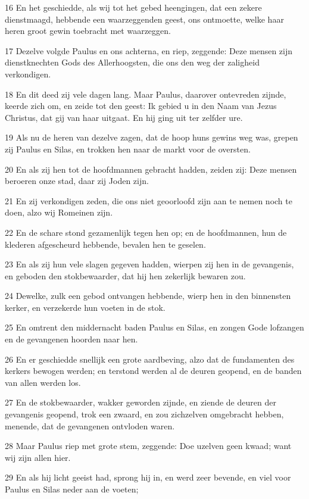 \par 16 En het geschiedde, als wij tot het gebed heengingen, dat een zekere dienstmaagd, hebbende een waarzeggenden geest, ons ontmoette, welke haar heren groot gewin toebracht met waarzeggen.
\par 17 Dezelve volgde Paulus en ons achterna, en riep, zeggende: Deze mensen zijn dienstknechten Gods des Allerhoogsten, die ons den weg der zaligheid verkondigen.
\par 18 En dit deed zij vele dagen lang. Maar Paulus, daarover ontevreden zijnde, keerde zich om, en zeide tot den geest: Ik gebied u in den Naam van Jezus Christus, dat gij van haar uitgaat. En hij ging uit ter zelfder ure.
\par 19 Als nu de heren van dezelve zagen, dat de hoop huns gewins weg was, grepen zij Paulus en Silas, en trokken hen naar de markt voor de oversten.
\par 20 En als zij hen tot de hoofdmannen gebracht hadden, zeiden zij: Deze mensen beroeren onze stad, daar zij Joden zijn.
\par 21 En zij verkondigen zeden, die ons niet geoorloofd zijn aan te nemen noch te doen, alzo wij Romeinen zijn.
\par 22 En de schare stond gezamenlijk tegen hen op; en de hoofdmannen, hun de klederen afgescheurd hebbende, bevalen hen te geselen.
\par 23 En als zij hun vele slagen gegeven hadden, wierpen zij hen in de gevangenis, en geboden den stokbewaarder, dat hij hen zekerlijk bewaren zou.
\par 24 Dewelke, zulk een gebod ontvangen hebbende, wierp hen in den binnensten kerker, en verzekerde hun voeten in de stok.
\par 25 En omtrent den middernacht baden Paulus en Silas, en zongen Gode lofzangen en de gevangenen hoorden naar hen.
\par 26 En er geschiedde snellijk een grote aardbeving, alzo dat de fundamenten des kerkers bewogen werden; en terstond werden al de deuren geopend, en de banden van allen werden los.
\par 27 En de stokbewaarder, wakker geworden zijnde, en ziende de deuren der gevangenis geopend, trok een zwaard, en zou zichzelven omgebracht hebben, menende, dat de gevangenen ontvloden waren.
\par 28 Maar Paulus riep met grote stem, zeggende: Doe uzelven geen kwaad; want wij zijn allen hier.
\par 29 En als hij licht geeist had, sprong hij in, en werd zeer bevende, en viel voor Paulus en Silas neder aan de voeten;
